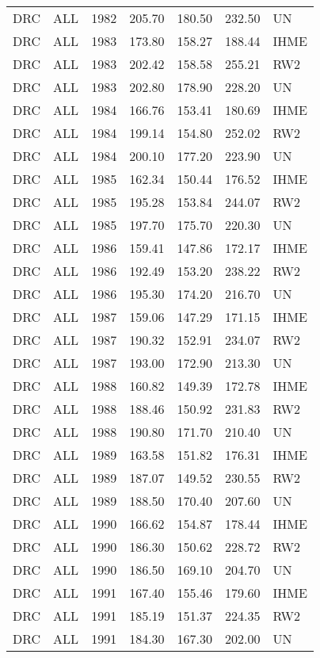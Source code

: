 \begin{longtable}{lllrrrl}
  DRC & ALL & 1982 & 205.70 & 180.50 & 232.50 & UN \\ 
  DRC & ALL & 1983 & 173.80 & 158.27 & 188.44 & IHME \\ 
  DRC & ALL & 1983 & 202.42 & 158.58 & 255.21 & RW2 \\ 
  DRC & ALL & 1983 & 202.80 & 178.90 & 228.20 & UN \\ 
  DRC & ALL & 1984 & 166.76 & 153.41 & 180.69 & IHME \\ 
  DRC & ALL & 1984 & 199.14 & 154.80 & 252.02 & RW2 \\ 
  DRC & ALL & 1984 & 200.10 & 177.20 & 223.90 & UN \\ 
  DRC & ALL & 1985 & 162.34 & 150.44 & 176.52 & IHME \\ 
  DRC & ALL & 1985 & 195.28 & 153.84 & 244.07 & RW2 \\ 
  DRC & ALL & 1985 & 197.70 & 175.70 & 220.30 & UN \\ 
  DRC & ALL & 1986 & 159.41 & 147.86 & 172.17 & IHME \\ 
  DRC & ALL & 1986 & 192.49 & 153.20 & 238.22 & RW2 \\ 
  DRC & ALL & 1986 & 195.30 & 174.20 & 216.70 & UN \\ 
  DRC & ALL & 1987 & 159.06 & 147.29 & 171.15 & IHME \\ 
  DRC & ALL & 1987 & 190.32 & 152.91 & 234.07 & RW2 \\ 
  DRC & ALL & 1987 & 193.00 & 172.90 & 213.30 & UN \\ 
  DRC & ALL & 1988 & 160.82 & 149.39 & 172.78 & IHME \\ 
  DRC & ALL & 1988 & 188.46 & 150.92 & 231.83 & RW2 \\ 
  DRC & ALL & 1988 & 190.80 & 171.70 & 210.40 & UN \\ 
  DRC & ALL & 1989 & 163.58 & 151.82 & 176.31 & IHME \\ 
  DRC & ALL & 1989 & 187.07 & 149.52 & 230.55 & RW2 \\ 
  DRC & ALL & 1989 & 188.50 & 170.40 & 207.60 & UN \\ 
  DRC & ALL & 1990 & 166.62 & 154.87 & 178.44 & IHME \\ 
  DRC & ALL & 1990 & 186.30 & 150.62 & 228.72 & RW2 \\ 
  DRC & ALL & 1990 & 186.50 & 169.10 & 204.70 & UN \\ 
  DRC & ALL & 1991 & 167.40 & 155.46 & 179.60 & IHME \\ 
  DRC & ALL & 1991 & 185.19 & 151.37 & 224.35 & RW2 \\ 
  DRC & ALL & 1991 & 184.30 & 167.30 & 202.00 & UN \\ 

\end{longtable}
